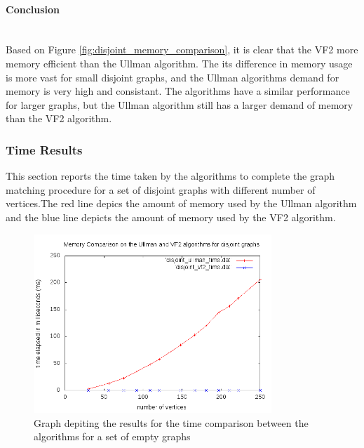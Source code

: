 \paragraph{Conclusion}\mbox{}\\
Based on Figure \ref{fig:disjoint_memory_comparison}, it is clear that the VF2 more memory efficient than the Ullman algorithm. The its difference in memory 
usage is more vast for small disjoint graphs, and the Ullman algorithms demand for memory is very high and consistant. The algorithms have a similar 
performance for larger graphs, but the Ullman algorithm still has a larger demand of memory than the VF2 algorithm.


\subsubsection{Time Results}
This section reports the time taken by the algorithms to complete the graph matching procedure for a set of disjoint graphs with different number of vertices.The red line depics the amount of memory
 used by the Ullman algorithm and the blue line depicts the amount of memory used by the VF2 algorithm.

\begin{figure}[H]
  \begin{center}
      \includegraphics[width=0.8\textwidth]{disjoint_time.png}
  \end{center}    
  \caption{Graph depiting the results for the time comparison between the algorithms for a set of empty graphs}
  \label{fig:disjoint_time_comparison}
\end{figure}


